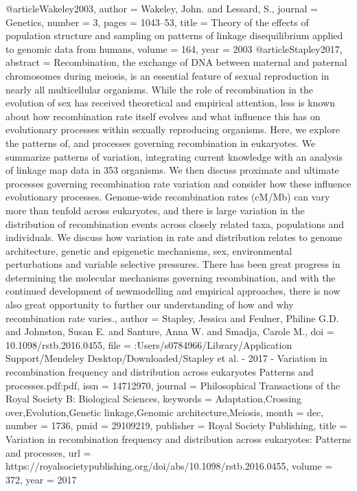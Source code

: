 @article{Wakeley2003,
author = {Wakeley, John. and Lessard, S.},
journal = {Genetics},
number = {3},
pages = {1043--53},
title = {{Theory of the effects of population structure and sampling on patterns of linkage disequilibrium applied to genomic data from humans}},
volume = {164},
year = {2003}
}
@article{Stapley2017,
abstract = {Recombination, the exchange of DNA between maternal and paternal chromosomes during meiosis, is an essential feature of sexual reproduction in nearly all multicellular organisms. While the role of recombination in the evolution of sex has received theoretical and empirical attention, less is known about how recombination rate itself evolves and what influence this has on evolutionary processes within sexually reproducing organisms. Here, we explore the patterns of, and processes governing recombination in eukaryotes. We summarize patterns of variation, integrating current knowledge with an analysis of linkage map data in 353 organisms. We then discuss proximate and ultimate processes governing recombination rate variation and consider how these influence evolutionary processes. Genome-wide recombination rates (cM/Mb) can vary more than tenfold across eukaryotes, and there is large variation in the distribution of recombination events across closely related taxa, populations and individuals. We discuss how variation in rate and distribution relates to genome architecture, genetic and epigenetic mechanisms, sex, environmental perturbations and variable selective pressures. There has been great progress in determining the molecular mechanisms governing recombination, and with the continued development of newmodelling and empirical approaches, there is now also great opportunity to further our understanding of how and why recombination rate varies.},
author = {Stapley, Jessica and Feulner, Philine G.D. and Johnston, Susan E. and Santure, Anna W. and Smadja, Carole M.},
doi = {10.1098/rstb.2016.0455},
file = {:Users/s0784966/Library/Application Support/Mendeley Desktop/Downloaded/Stapley et al. - 2017 - Variation in recombination frequency and distribution across eukaryotes Patterns and processes.pdf:pdf},
issn = {14712970},
journal = {Philosophical Transactions of the Royal Society B: Biological Sciences},
keywords = {Adaptation,Crossing over,Evolution,Genetic linkage,Genomic architecture,Meiosis},
month = {dec},
number = {1736},
pmid = {29109219},
publisher = {Royal Society Publishing},
title = {{Variation in recombination frequency and distribution across eukaryotes: Patterns and processes}},
url = {https://royalsocietypublishing.org/doi/abs/10.1098/rstb.2016.0455},
volume = {372},
year = {2017}
}
